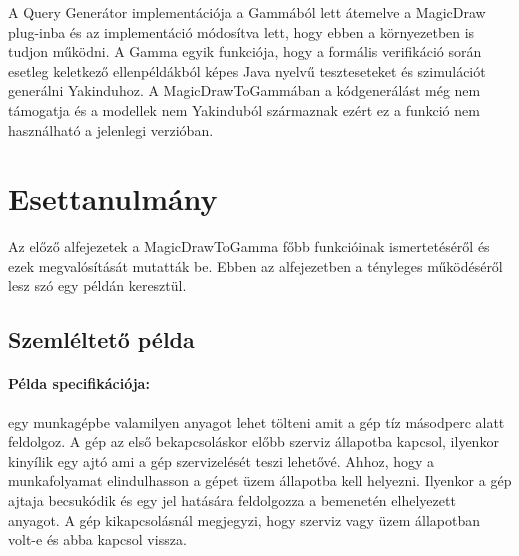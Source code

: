 A Query Generátor implementációja a Gammából lett átemelve a MagicDraw plug-inba és az implementáció módosítva lett, hogy ebben a környezetben is tudjon működni. A Gamma egyik funkciója, hogy a formális verifikáció során esetleg keletkező ellenpéldákból képes Java nyelvű teszteseteket és szimulációt generálni Yakinduhoz. A MagicDrawToGammában a kódgenerálást még nem támogatja és a modellek nem Yakinduból származnak ezért ez a funkció nem használható a jelenlegi verzióban.

\section{Esettanulmány}

Az előző alfejezetek a MagicDrawToGamma főbb funkcióinak ismertetéséről és ezek megvalósítását mutatták be. Ebben az alfejezetben a  tényleges működéséről lesz szó egy példán keresztül.

\subsection{Szemléltető példa}

\paragraph{Példa specifikációja:} egy munkagépbe valamilyen anyagot lehet tölteni amit a gép tíz másodperc alatt feldolgoz. A gép az első bekapcsoláskor előbb szerviz állapotba kapcsol, ilyenkor kinyílik egy ajtó ami a gép szervizelését teszi lehetővé. Ahhoz, hogy a munkafolyamat elindulhasson a gépet üzem állapotba kell helyezni. Ilyenkor a gép ajtaja becsukódik és egy jel hatására feldolgozza a bemenetén elhelyezett anyagot. A gép kikapcsolásnál megjegyzi, hogy szerviz vagy üzem állapotban volt-e és abba kapcsol vissza.

